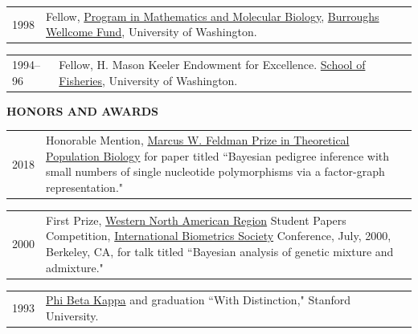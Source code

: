 \documentclass[11pt]{article}
\newlength{\myindent}
\newlength{\postskip}
\newlength{\preskip}
\newlength{\scndcol}
\begin{document}
\begin{tabular}{ @{}p{2.5\myindent} p{\scndcol}@{}  }
\hspace*{\myindent}1998   &  Fellow, \href{http://www.math.fsu.edu/~pmmb/}{Program in Mathematics and Molecular Biology}, \href{http://www.bwfund.org/}{Burroughs
Wellcome Fund}, University of Washington.
\end{tabular}

\begin{tabular}{ @{}p{2.5\myindent} p{\scndcol}@{}  }
\hspace*{\myindent}1994--96 & Fellow,  H. Mason
Keeler Endowment for Excellence.  \href{http://www.fish.washington.edu/}{School of Fisheries}, University of
Washington.\\
\end{tabular}
\vspace*{\postskip}

{\bf HONORS AND AWARDS}
\vspace*{\preskip}

\begin{tabular}{ @{}p{2.5\myindent} p{\scndcol}@{}  }
\hspace*{\myindent}2018  &  Honorable Mention,  \href{https://doi.org/10.1016/j.tpb.2017.11.004}{Marcus W. Feldman Prize in Theoretical Population Biology} for paper titled ``Bayesian pedigree inference with small numbers of single nucleotide polymorphisms via a factor-graph representation."  \\
\end{tabular}

\begin{tabular}{ @{}p{2.5\myindent} p{\scndcol}@{}  }
\hspace*{\myindent}2000  &  First Prize,  \href{http://www.wnar.org/}{Western North American Region} Student Papers
Competition, \href{http://www.tibs.org/}{International Biometrics Society} Conference, July, 2000, Berkeley,
CA, for talk titled ``Bayesian analysis of genetic mixture and admixture."  \\
\end{tabular}

\begin{tabular}{ @{}p{2.5\myindent} p{\scndcol}@{}  }
\hspace*{\myindent}1993  &  \href{http://www.pbk.org/}{Phi Beta Kappa} and graduation ``With Distinction," Stanford University.\\
\end{tabular}
\vspace*{\postskip}
\end{document}

